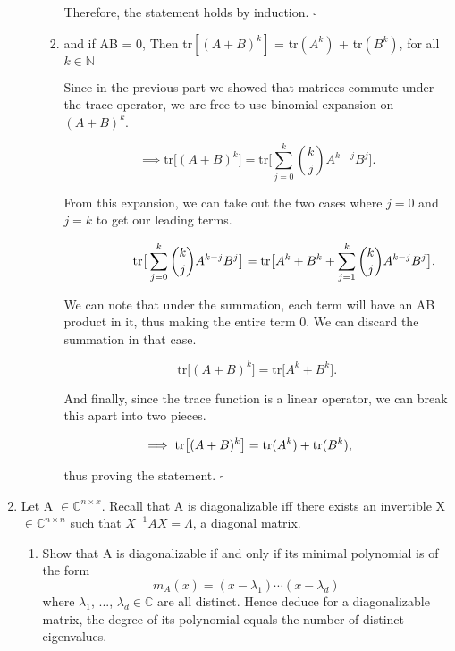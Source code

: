 \documentclass[12pt]{article}
\newcommand{\jump}{\vspace{5mm}}
\newcommand{\C}{\mathbb{C}}
\newcommand{\lm}{\lambda}
\begin{document}
\begin{enumerate}[leftmargin=\labelsep]
\begin{enumerate}
\begin{enumerate}
        Therefore, the statement holds by induction. $\square$

        \jump
        \item and if AB = 0, Then tr$[(A+B)^k]$ = tr$(A^k)$ + tr$(B^k)$, for all $k \in \mathbb{N}$

        \jump
        Since in the previous part we showed that matrices commute under the trace operator, we are free to use binomial expansion on $(A+B)^k$.

        \[
        \implies \text{tr}\big[ (A+B)^k\big] = \text{tr}\big[ \sum_{j = 0}^k \binom{k}{j} A^{k - j}B^j\big].
        \]

        From this expansion, we can take out the two cases where $j = 0$ and $j = k$ to get our leading terms.

        \[
        \hspace{15mm}\text{tr}\big[ \sum_{j = 0}^k \binom{k}{j} A^{k - j}B^j\big] = \text{tr}\big[ A^k + B^k + \sum_{j = 1}^k \binom{k}{j} A^{k - j}B^j\big].
        \]

        We can note that under the summation, each term will have an AB product in it, thus making the entire term 0. We can discard the summation in that case. 

        \[
        \text{tr}\big[ (A+B)^k\big] = \text{tr}\big[A^k + B^k\big].  
        \]

        And finally, since the trace function is a linear operator, we can break this apart into two pieces.

        \[
        \hspace{-5mm}\implies \text{tr}\big[ (A+B)^k\big] = \text{tr}(A^k) + \text{tr}(B^k), 
        \]

        thus proving the statement. $\square$
        
    \end{enumerate}

\end{enumerate}

\jump
\item Let A $\in \C^{n\times x}$. Recall that A is diagonalizable iff there exists an invertible X $\in \C^{n \times n}$ such that $X^{-1}AX = \Lambda$, a diagonal matrix.
\begin{enumerate}
    \item Show that A is diagonalizable if and only if its minimal polynomial is of the form 
    \[
    m_A(x) = (x - \lm_1)\cdots(x - \lm_d)
    \]
    where $\lm_1$, ..., $\lm_d \in \C$ are all distinct. Hence deduce for a diagonalizable matrix, the degree of its polynomial equals the number of distinct eigenvalues.

\end{enumerate}

\end{enumerate}
\end{document}

